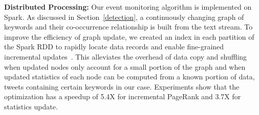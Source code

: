 
\noindent\textbf{Distributed Processing:}
Our event monitoring algorithm is implemented on Spark.
As discussed in Section~\ref{detection}, a continuously changing graph of keywords and their co-occurrence relationship is built from the text stream.
To improve the efficiency of graph update, we created an index in each partition of the Spark RDD to rapidly locate data records and enable fine-grained incremental updates~\cite{ju2015igraph}.
This alleviates the overhead of data copy and shuffling when updated nodes only account for a small portion of the graph and when updated statistics of each node can be computed from a known portion of data, \ie tweets containing certain keywords in our case.
Experiments show that the optimization has a speedup of 5.4X for incremental PageRank and 3.7X for statistics update.






